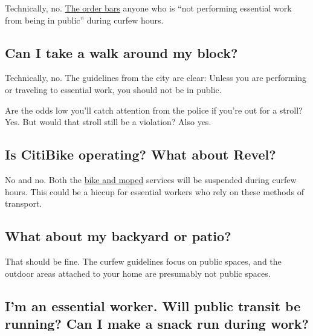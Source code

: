 Technically, no.
\href{https://www1.nyc.gov/assets/counseltothemayor/downloads/Curfew-FAQ.pdf}{The
order bars} anyone who is ``not performing essential work from being in
public'' during curfew hours.

\hypertarget{can-i-take-a-walk-around-my-block}{%
\subsection{Can I take a walk around my
block?}\label{can-i-take-a-walk-around-my-block}}

Technically, no. The guidelines from the city are clear: Unless you are
performing or traveling to essential work, you should not be in public.

Are the odds low you'll catch attention from the police if you're out
for a stroll? Yes. But would that stroll still be a violation? Also yes.

\hypertarget{is-citibike-operating-what-about-revel}{%
\subsection{Is CitiBike operating? What about
Revel?}\label{is-citibike-operating-what-about-revel}}

No and no. Both the
\href{https://www1.nyc.gov/assets/counseltothemayor/downloads/Curfew-FAQ.pdf}{bike
and moped} services will be suspended during curfew hours. This could be
a hiccup for essential workers who rely on these methods of transport.

\hypertarget{what-about-my-backyard-or-patio}{%
\subsection{What about my backyard or
patio?}\label{what-about-my-backyard-or-patio}}

That should be fine. The curfew guidelines focus on public spaces, and
the outdoor areas attached to your home are presumably not public
spaces.

\hypertarget{im-an-essential-worker-will-public-transit-be-running-can-i-make-a-snack-run-during-work}{%
\subsection{I'm an essential worker. Will public transit be running? Can
I make a snack run during
work?}\label{im-an-essential-worker-will-public-transit-be-running-can-i-make-a-snack-run-during-work}}

